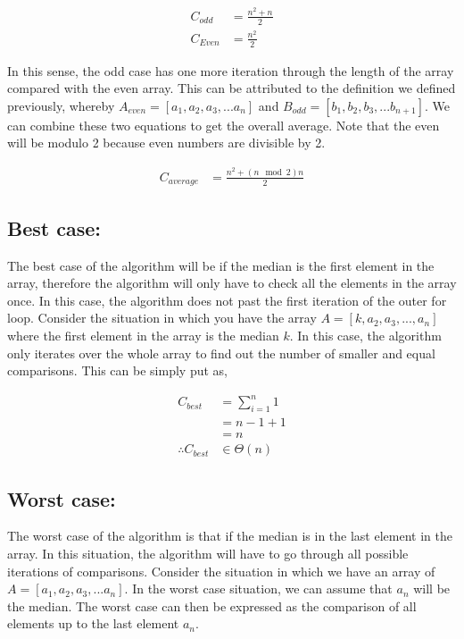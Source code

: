 \documentclass[12pt]{article}
\begin{document}
	\begin{align*}
		C_{odd} &= \frac{n^2+n}{2}\\
		C_{Even} &= \frac{n^2}{2}
	\end{align*}

	In this sense, the odd case has one more iteration through the length of the array compared with the even array. This can be attributed to the definition we defined previously, whereby $A_{even} = [a_1,a_2,a_3,...a_n]$ and $B_{odd} = [b_1,b_2,b_3,...b_{n+1}]$. We can combine these two equations to get the overall average. Note that the even will be modulo 2 because even numbers are divisible by 2.
	
	\begin{align*}
C_{average} &= \frac{n^2+(n\mod 2)n}{2}
	\end{align*}

	\subsection{Best case:}
	The best case of the algorithm will be if the median is the first element in the array, therefore the algorithm will only have to check all the elements in the array once. In this case, the algorithm does not past the first iteration of the outer for loop. 
	Consider the situation in which you have the array $A=[k,a_2,a_3,...,a_n]$ where the first element in the array is the median $k$. In this case, the algorithm only iterates over the whole array to find out the number of smaller and equal comparisons. This can be simply put as,
	
	\begin{align*}
	C_{best} &= \sum\limits_{i=1}^{n}1\\
				&= n-1+1\\
				&= n\\
				\therefore C_{best} &\in \Theta(n)
	\end{align*}
	
	
	\subsection{Worst case:}
	The worst case of the algorithm is that if the median is in the last element in the array. In this situation, the algorithm will have to go through all possible iterations of comparisons. Consider the situation in which we have an array of $A=[a_1,a_2,a_3,...a_n]$. In the worst case situation, we can assume that $a_n$ will be the median. The worst case can then be expressed as the comparison of all elements up to the last element $a_n$.
	
\end{document}
